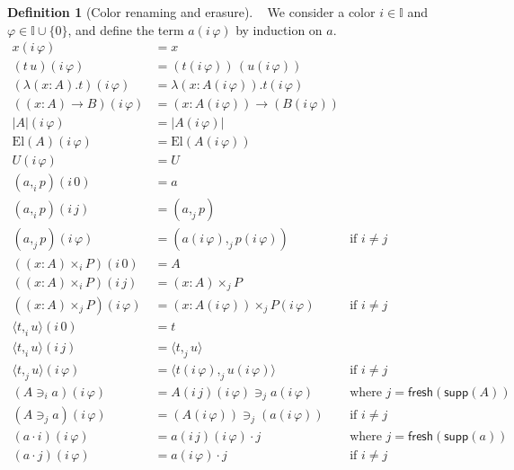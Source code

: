\documentclass[english]{PaperTools/latex/entcs}
\theoremstyle{plain}
\theoremstyle{definition}
\newtheorem{definition}[theorem]{Definition}
\theoremstyle{remark}
\newcommand\CP[3]{(#2,_{#1} #3)}
\newcommand\CTimes[2]{(#2) ×_{#1}}
\newcommand\op[1]{∋_{#1}}
\newcommand\fp[3]{⟨#2 ,_{#1} #3⟩}
\newcommand\mor[2]{({#1}\,{#2})}
\def\fresh#1{\mathsf{fresh}(#1)}
\def\support#1{\mathsf{supp}(#1)}
\def\El#1{\mathrm{El}(#1)}
\begin{document}
\begin{definition}[Color renaming and erasure]~
  \label{def:color-erasure}
  We consider a color $i ∈ 𝕀$ and $φ ∈ 𝕀 ∪ \{0\}$,
  and define the term $a(i\,φ)$ by induction on $a$.
\begin{align*}
  x \mor{i}{φ} & = x \\
  (t\,u)\mor{i}{φ} &= (t\mor{i}{φ}) \, (u\mor{i}{φ}) \\
  (λ(x:A).t)\mor{i}{φ} &= λ(x:A\mor{i}{φ}).t\mor{i}{φ} \\
  ((x:A)→B)\mor{i}{φ} &= (x:A\mor{i}{φ})→(B\mor{i}{φ}) \\
%
  |A| \mor{i}{φ} & = |A\mor{i}{φ}| \\
  \El{A} \mor{i}{φ} & = \El {A\mor{i}{φ}} \\
  U \mor{i}{φ} & = U \\
%
  {\CP {i} a p}\mor{i}{0} &= a \\
  {\CP {i} a p}\mor{i}{j} &= \CP {j} a p \\
  {\CP {j} a p}\mor{i}{φ} &= \CP {j} {a\mor{i}{φ}} {p\mor{i}{φ}} &\text{if $i ≠ j$} \\
  (\CTimes {i} {x:A} P)\mor{i}{0} &= A \\
  (\CTimes {i} {x:A} P)\mor{i}{j} &= \CTimes {j} {x:A} P \\
  (\CTimes {j} {x:A} P)\mor{i}{φ} &= \CTimes {j} {x:A\mor{i}{φ}} {P\mor{i}{φ}} &\text{if $i ≠ j$} \\
  {\fp {i} t u}\mor{i}{0} &= t \\
  {\fp {i} t u}\mor{i}{j} &= \fp {j} t u \\
  {\fp {j} t u}\mor{i}{φ} &= \fp {j} {t\mor{i}{φ}} {u\mor{i}{φ}} &\text{if $i ≠ j$} \\
  (A \op {i} a)\mor{i}{φ} &= {A\mor{i}{j}\mor{i}{φ}} \op {j} {a\mor{i}{φ}} &\text{where $j = \fresh{\support A}$} \\
  (A \op {j} a)\mor{i}{φ} &= (A\mor{i}{φ}) \op {j} (a\mor{i}{φ}) &\text{if $i ≠ j$} \\
%
  (a · i)\mor{i}{φ} &= a \mor{i}{j}\mor{i}{φ} · j &\text{where $j = \fresh{\support a}$} \\
  (a · j)\mor{i}{φ} &= a\mor{i}{φ} · j &\text{if $i ≠ j$} \\
  \end{align*}
\end{definition}
\end{document}
